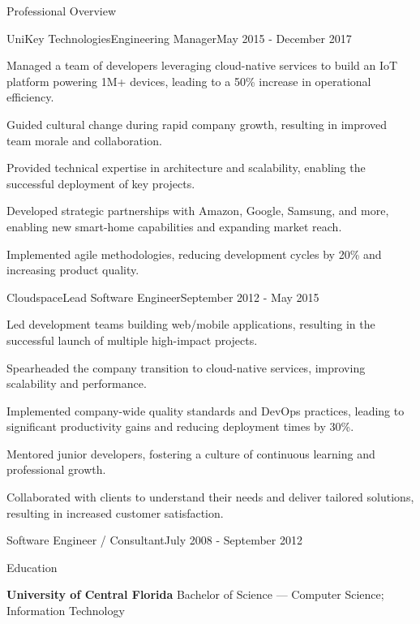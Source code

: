 \documentclass{resume} %
\begin{document}
\begin{rSection}{Professional Overview}
  \begin{rNewRole}{UniKey Technologies}{Engineering Manager}{May 2015 - December 2017}
    \item Managed a team of developers leveraging cloud-native services to build an IoT platform powering 1M+ devices, leading to a 50\% increase in operational efficiency.
    \item Guided cultural change during rapid company growth, resulting in improved team morale and collaboration.
    \item Provided technical expertise in architecture and scalability, enabling the successful deployment of key projects.
    \item Developed strategic partnerships with Amazon, Google, Samsung, and more, enabling new smart-home capabilities and expanding market reach.
    \item Implemented agile methodologies, reducing development cycles by 20\% and increasing product quality.
  \end{rNewRole}

  \begin{rNewRole}{Cloudspace}{Lead Software Engineer}{September 2012 - May 2015}
    \item Led development teams building web/mobile applications, resulting in the successful launch of multiple high-impact projects.
    \item Spearheaded the company transition to cloud-native services, improving scalability and performance.
    \item Implemented company-wide quality standards and DevOps practices, leading to significant productivity gains and reducing deployment times by 30\%.
    \item Mentored junior developers, fostering a culture of continuous learning and professional growth.
    \item Collaborated with clients to understand their needs and deliver tailored solutions, resulting in increased customer satisfaction.
  \end{rNewRole}
  
  
  \begin{rCompany}{Software Engineer / Consultant}{July 2008 - September 2012}{}

  \end{rCompany}
  
  
  
\end{rSection}

\vspace{0.5em} %
\begin{rSection}{Education}
  
  {\bf University of Central Florida } Bachelor of Science --- Computer Science; Information Technology
  
\end{rSection}
\end{document}
